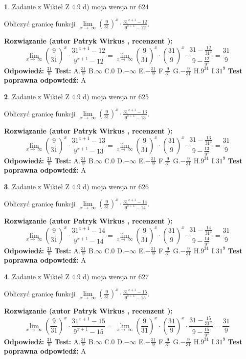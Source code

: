 \documentclass[12pt, a4paper]{article}
\theoremstyle{definition} %
\newtheorem{zad}{}
\newcommand{\zadStart}[1]{\begin{zad}#1\newline}
\newcommand{\zadStop}{\end{zad}}
\newcommand{\rozwStart}[2]{\noindent \textbf{Rozwiązanie (autor #1 , recenzent #2): }\newline}
\newcommand{\rozwStop}{\newline}
\newcommand{\odpStart}{\noindent \textbf{Odpowiedź:}\newline}
\newcommand{\odpStop}{\newline}
\newcommand{\testStart}{\noindent \textbf{Test:}\newline}
\newcommand{\testStop}{\newline}
\newcommand{\kluczStart}{\noindent \textbf{Test poprawna odpowiedź:}\newline}
\newcommand{\kluczStop}{\newline}
\begin{document}
\zadStart{Zadanie z Wikieł Z 4.9 d) moja wersja nr 624}


Obliczyć granicę funkcji  $\lim\limits_{x\to\ \infty}(\frac{9}{31})^{x}\cdot\frac{31^{x+1}-12}{9^{x+1}-12}$.
\zadStop
\rozwStart{Patryk Wirkus}{}
$$\lim\limits_{x\to\ \infty}(\frac{9}{31})^{x}\cdot\frac{31^{x+1}-12}{9^{x+1}-12}=\lim\limits_{x\to\ \infty}(\frac{9}{31})^{x}\cdot(\frac{31}{9})^{x} \cdot \frac{31-\frac{12}{31^{x}}}{9-\frac{12}{9^{x}}} = \frac{31}{9}$$
\rozwStop
\odpStart
$\frac{31}{9}$
\odpStop
\testStart
A.$\frac{31}{9}$ B.$\infty$ C.$0$ D.$-\infty$ E.$-\frac{31}{9}$
F.$\frac{9}{31}$ G.$-\frac{9}{31}$
H.$9^{31}$
I.$31^{9}$
\testStop
\kluczStart
A
\kluczStop



\zadStart{Zadanie z Wikieł Z 4.9 d) moja wersja nr 625}


Obliczyć granicę funkcji  $\lim\limits_{x\to\ \infty}(\frac{9}{31})^{x}\cdot\frac{31^{x+1}-13}{9^{x+1}-13}$.
\zadStop
\rozwStart{Patryk Wirkus}{}
$$\lim\limits_{x\to\ \infty}(\frac{9}{31})^{x}\cdot\frac{31^{x+1}-13}{9^{x+1}-13}=\lim\limits_{x\to\ \infty}(\frac{9}{31})^{x}\cdot(\frac{31}{9})^{x} \cdot \frac{31-\frac{13}{31^{x}}}{9-\frac{13}{9^{x}}} = \frac{31}{9}$$
\rozwStop
\odpStart
$\frac{31}{9}$
\odpStop
\testStart
A.$\frac{31}{9}$ B.$\infty$ C.$0$ D.$-\infty$ E.$-\frac{31}{9}$
F.$\frac{9}{31}$ G.$-\frac{9}{31}$
H.$9^{31}$
I.$31^{9}$
\testStop
\kluczStart
A
\kluczStop



\zadStart{Zadanie z Wikieł Z 4.9 d) moja wersja nr 626}


Obliczyć granicę funkcji  $\lim\limits_{x\to\ \infty}(\frac{9}{31})^{x}\cdot\frac{31^{x+1}-14}{9^{x+1}-14}$.
\zadStop
\rozwStart{Patryk Wirkus}{}
$$\lim\limits_{x\to\ \infty}(\frac{9}{31})^{x}\cdot\frac{31^{x+1}-14}{9^{x+1}-14}=\lim\limits_{x\to\ \infty}(\frac{9}{31})^{x}\cdot(\frac{31}{9})^{x} \cdot \frac{31-\frac{14}{31^{x}}}{9-\frac{14}{9^{x}}} = \frac{31}{9}$$
\rozwStop
\odpStart
$\frac{31}{9}$
\odpStop
\testStart
A.$\frac{31}{9}$ B.$\infty$ C.$0$ D.$-\infty$ E.$-\frac{31}{9}$
F.$\frac{9}{31}$ G.$-\frac{9}{31}$
H.$9^{31}$
I.$31^{9}$
\testStop
\kluczStart
A
\kluczStop



\zadStart{Zadanie z Wikieł Z 4.9 d) moja wersja nr 627}


Obliczyć granicę funkcji  $\lim\limits_{x\to\ \infty}(\frac{9}{31})^{x}\cdot\frac{31^{x+1}-15}{9^{x+1}-15}$.
\zadStop
\rozwStart{Patryk Wirkus}{}
$$\lim\limits_{x\to\ \infty}(\frac{9}{31})^{x}\cdot\frac{31^{x+1}-15}{9^{x+1}-15}=\lim\limits_{x\to\ \infty}(\frac{9}{31})^{x}\cdot(\frac{31}{9})^{x} \cdot \frac{31-\frac{15}{31^{x}}}{9-\frac{15}{9^{x}}} = \frac{31}{9}$$
\rozwStop
\odpStart
$\frac{31}{9}$
\odpStop
\testStart
A.$\frac{31}{9}$ B.$\infty$ C.$0$ D.$-\infty$ E.$-\frac{31}{9}$
F.$\frac{9}{31}$ G.$-\frac{9}{31}$
H.$9^{31}$
I.$31^{9}$
\testStop
\kluczStart
A
\kluczStop
\end{document}
